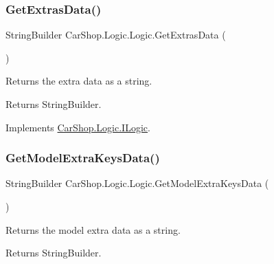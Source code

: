 \subsubsection{\texorpdfstring{Get\+Extras\+Data()}{GetExtrasData()}}
{\footnotesize\ttfamily String\+Builder Car\+Shop.\+Logic.\+Logic.\+Get\+Extras\+Data (\begin{DoxyParamCaption}{ }\end{DoxyParamCaption})}



Returns the extra data as a string. 

\begin{DoxyReturn}{Returns}
String\+Builder.
\end{DoxyReturn}


Implements \mbox{\hyperlink{interface_car_shop_1_1_logic_1_1_i_logic_a5ad3fa8e566e99e43a70a5e9f7ffb114}{Car\+Shop.\+Logic.\+I\+Logic}}.

\mbox{\label{class_car_shop_1_1_logic_1_1_logic_adffc5bad6d7ef7a2914626b2c27a75c1}} 
\subsubsection{\texorpdfstring{Get\+Model\+Extra\+Keys\+Data()}{GetModelExtraKeysData()}}
{\footnotesize\ttfamily String\+Builder Car\+Shop.\+Logic.\+Logic.\+Get\+Model\+Extra\+Keys\+Data (\begin{DoxyParamCaption}{ }\end{DoxyParamCaption})}



Returns the model extra data as a string. 

\begin{DoxyReturn}{Returns}
String\+Builder.
\end{DoxyReturn}
\mbox{\label{class_car_shop_1_1_logic_1_1_logic_abeb648b7fcd87060c3fcbfeef3cda77f}} 
